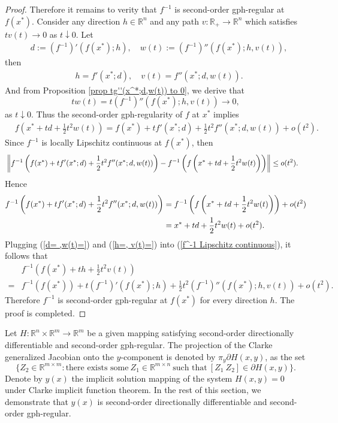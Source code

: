 \documentclass[11pt]{article}
\theoremstyle{definition}
\theoremstyle{remark}
\numberwithin{equation}{section}
\begin{document}
\begin{proof}
Therefore it remains  to verity that $f^{-1}$ is second-order gph-regular at $f(x^*)$.
Consider any direction $h\in \mathbb{R}^n$ and any path $v:\mathbb{R}_{+}\to \mathbb{R}^n$ which satisfies
$tv(t)\to 0$ as
$t\downarrow 0$.  Let
\begin{align}\label{d= ,w(t)=}
   &  d:=(f^{-1})'(f(x^*);h),\quad w(t):=(f^{-1})''(f(x^*);h,v(t)),
\end{align}
then
\begin{align}\label{h=, v(t)=}
  &h=f'(x^*;d),\quad v(t)=f''(x^*;d,w(t)).
\end{align}
And from Proposition \ref{prop tg''(x^*;d,w(t)) to 0}, we derive that
      $$tw(t)=t(f^{-1})''(f(x^*);h,v(t))\to 0,$$ as $t\downarrow 0$.
 Thus the second-order gph-regularity of $f$ at $x^*$ implies
\begin{align*}
  & f\left(x^*+td+\frac{1}{2}t^2w(t)\right)=f(x^*)+tf'(x^*;d)+\frac{1}{2}t^2f''(x^*;d,w(t))+o(t^2).
\end{align*}
     Since $f^{-1}$ is locally Lipschitz continuous at $f(x^*)$, then
\begin{align}%
  &\left\|f^{-1}\left(f(x^*)+tf'(x^*;d)+\frac{1}{2}t^2f''(x^*;d,w(t))\right)
  -f^{-1}\left(f\left(x^*+td+\frac{1}{2}t^2w(t)\right)\right)\right\|\le o(t^2).\notag
\end{align}
 Hence
 \begin{align}\label{f^-1 Lipschitz continuous}
     f^{-1}\left(f(x^*)+tf'(x^*;d)+\frac{1}{2}t^2f''(x^*;d,w(t))\right)
     &=f^{-1}\left(f\left(x^*+td+\frac{1}{2}t^2w(t)\right)\right)+ o(t^2)\notag\\
     &=x^*+td+\frac{1}{2}t^2w(t)+ o(t^2).
     \end{align}
 Plugging (\ref{d= ,w(t)=}) and (\ref{h=, v(t)=}) into (\ref{f^-1 Lipschitz continuous}), it follows that
     \begin{align*}
        &f^{-1}\left(f(x^*)+th+\frac{1}{2}t^2v(t)\right)\\
        =&f^{-1}\left(f(x^*)\right)+t(f^{-1})'(f(x^*);h)+\frac{1}{2}t^2(f^{-1})''(f(x^*);h,v(t))+
        o(t^2).
     \end{align*}
     Therefore $f^{-1}$ is second-order gph-regular at $f(x^*)$ for every direction $h$. The proof is completed.
\end{proof}

Let $H:\mathbb{R}^n \times \mathbb{R}^m\to  \mathbb{R}^m$ be a given mapping satisfying second-order directionally differentiable and second-order gph-regular.
  The projection of the Clarke generalized Jacobian onto the $y$-component is denoted by $\pi_y\partial H(x,y)$, as the set
$$\{Z_2\in \mathbb{R}^{m\times m}: \text{there exists some}~ Z_1\in \mathbb{R}^{m\times n} ~\text{such that}~  [Z_1~Z_2]\in \partial H(x,y)\}.$$
Denote by $y(x)$ the implicit solution mapping  of the system $H(x,y)=0$  under Clarke implicit function theorem.
In the rest of this section, we demonstrate that  $y(x)$
 is  second-order directionally differentiable and  second-order gph-regular.
\end{document}
